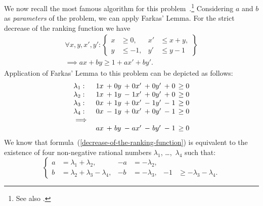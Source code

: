 \documentclass{acm_proc_article-sp}
\newcommand{\itc}{\mathrel{:}}
\begin{document}
We now recall the most famous algorithm for this
problem~\cite{PodelskiR04}.\footnote{See also \cite{BagnaraMPZ12IC}.}
Considering $a$ and $b$ as \emph{parameters}
of the problem, we can apply Farkas' Lemma.
For the strict decrease of the ranking function we have
\begin{multline}
\label{decrease-of-the-ranking-function}
  \forall x, y, x', y' \itc
    \left\{
      \begin{aligned}
        x  &\ge 0,  & x' &\le x+y, \\
        y  &\le -1, & y' &\le y-1
      \end{aligned}
    \right\} \\
  \implies
    ax + by \ge 1 + ax' + by'.
\end{multline}
Application of Farkas' Lemma to this problem can be depicted
as follows:
\[
  \begin{array}{lc@{\hspace{1ex}}c@{\;}c@{\hspace{1ex}}c@{\;}c@{\hspace{1ex}}c@{\;}c@{\hspace{1ex}}c@{\;}c@{\hspace{1ex}}c@{\;}c@{\hspace{1ex}}}
    \lambda_1: & 1x & + & 0y & + & 0x' & + & 0y' & + & 0 & \ge & 0 \\
    \lambda_2: & 1x & + & 1y & - & 1x' & + & 0y' & + & 0 & \ge & 0 \\
    \lambda_3: & 0x & + & 1y & + & 0x' & - & 1y' & - & 1 & \ge & 0 \\
    \lambda_4: & 0x & - & 1y & + & 0x' & + & 0y' & - & 1 & \ge & 0 \\
    \implies \\
               & ax & + & by & - & ax' & - & by' & - & 1 & \ge & 0
  \end{array}
\]
We know that formula~(\ref{decrease-of-the-ranking-function})
is equivalent to the existence of
four non-negative rational numbers
$\lambda_1$, \dots,~$\lambda_4$ such that:
\begin{equation}
\label{fnlindec}
  \left\{
    \begin{aligned}
         a &=   \lambda_1 + \lambda_2,
      & -a &=   -\lambda_2, \\
         b &=   \lambda_2 + \lambda_3 - \lambda_4,
      & -b &=   -\lambda_3,
      & -1 &\ge -\lambda_3 -\lambda_4.
    \end{aligned}
  \right.
\end{equation}
\end{document}
